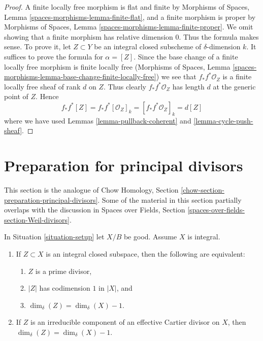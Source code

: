 \begin{proof}
A finite locally free morphism is flat and finite by
Morphisms of Spaces, Lemma \ref{spaces-morphisms-lemma-finite-flat},
and a finite morphism is proper
by Morphisms of Spaces, Lemma \ref{spaces-morphisms-lemma-finite-proper}.
We omit showing that a finite
morphism has relative dimension $0$. Thus the formula makes sense.
To prove it, let $Z \subset Y$ be an integral closed subscheme
of $\delta$-dimension $k$. It suffices to prove the formula
for $\alpha = [Z]$. Since the base change of a finite locally free
morphism is finite locally free
(Morphisms of Spaces, Lemma
\ref{spaces-morphisms-lemma-base-change-finite-locally-free})
we see that $f_*f^*\mathcal{O}_Z$ is a finite locally free sheaf of
rank $d$ on $Z$. Thus clearly $f_*f^*\mathcal{O}_Z$ has length $d$
at the generic point of $Z$. Hence
$$
f_*f^*[Z] = f_*f^*[\mathcal{O}_Z]_k =
[f_*f^*\mathcal{O}_Z]_k = d[Z]
$$
where we have used Lemmas \ref{lemma-pullback-coherent} and
\ref{lemma-cycle-push-sheaf}.
\end{proof}










\section{Preparation for principal divisors}
\label{section-preparation-principal-divisors}

\noindent
This section is the analogue of
Chow Homology, Section \ref{chow-section-preparation-principal-divisors}.
Some of the material in this section partially overlaps with the
discussion in Spaces over Fields, Section
\ref{spaces-over-fields-section-Weil-divisors}.

\begin{lemma}
\label{lemma-divisor-delta-dimension}
In Situation \ref{situation-setup} let $X/B$ be good. Assume $X$ is
integral.
\begin{enumerate}
\item If $Z \subset X$ is an integral closed subspace, then
the following are equivalent:
\begin{enumerate}
\item $Z$ is a prime divisor,
\item $|Z|$ has codimension $1$ in $|X|$, and
\item $\dim_\delta(Z) = \dim_\delta(X) - 1$.
\end{enumerate}
\item If $Z$ is an irreducible component of an effective Cartier
divisor on $X$, then $\dim_\delta(Z) = \dim_\delta(X) - 1$.
\end{enumerate}
\end{lemma}

